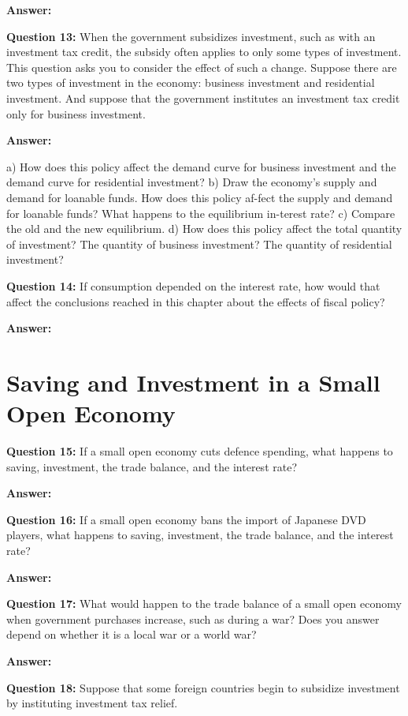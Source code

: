 \documentclass[a4paper, 11pt]{article}
\begin{document}
\textbf{Answer:} 


\textbf{Question 13:} When the government subsidizes investment, such as with an investment tax credit, the subsidy often applies to only some types of investment. This question asks you to consider the effect of such a change. Suppose there are two types of investment in the economy: business investment and residential investment. And suppose that the government institutes an investment tax credit only for business investment.

\textbf{Answer:}

a) How does this policy affect the demand curve for business investment and the demand curve for residential investment?
b) Draw the economy’s supply and demand for loanable funds. How does this policy af-fect the supply and demand for loanable funds? What happens to the equilibrium in-terest rate?
c) Compare the old and the new equilibrium.
d) How does this policy affect the total quantity of investment? The quantity of business investment? The quantity of residential investment?


\textbf{Question 14:} If consumption depended on the interest rate, how would that affect the conclusions reached in this chapter about the effects of fiscal policy?

\textbf{Answer:}  

\section{Saving and Investment in a Small Open Economy}

\textbf{Question 15:} If a small open economy cuts defence spending, what happens to saving, investment, the trade balance, and the interest rate?

\textbf{Answer:}  

\textbf{Question 16:} If a small open economy bans the import of Japanese DVD players, what happens to saving, investment, the trade balance, and the interest rate?

\textbf{Answer:} 


\textbf{Question 17:} What would happen to the trade balance of a small open economy when government purchases increase, such as during a war? Does you answer depend on whether it is a local war or a world war?

\textbf{Answer:} 


\textbf{Question 18:} Suppose that some foreign countries begin to subsidize investment by instituting investment tax relief.
\end{document}
